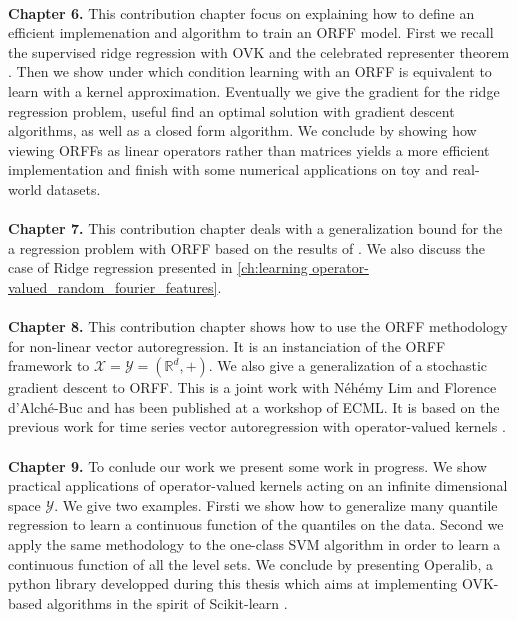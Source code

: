 \paragraph{}
\textbf{Chapter 6.}
This contribution chapter focus on explaining how to define an efficient
implemenation and algorithm to train an \acs{ORFF} model. First we recall
the supervised ridge regression with \acs{OVK} and the celebrated representer
theorem \citep{Wahba90}. Then we show under which condition learning with an
\acs{ORFF} is equivalent to learn with a kernel approximation. Eventually
we give the gradient for the ridge regression problem, useful find an optimal
solution with gradient descent algorithms, as well as a closed form algorithm.
We conclude by showing how viewing \acsp{ORFF} as linear operators rather than 
matrices yields a more efficient implementation and finish with some numerical
applications on toy and real-world datasets.

\paragraph{}
\textbf{Chapter 7.}
This contribution chapter deals with a generalization bound for the a
regression problem with ORFF based on the results of \citet{rahimi2009weighted,
maurer2016vector}.  We also discuss the case of Ridge regression presented in
\cref{ch:learning operator-valued_random_fourier_features}.

\paragraph{}
\textbf{Chapter 8.}
This contribution chapter shows how to use the \acs{ORFF} methodology for
non-linear vector autoregression. It is an instanciation of the \acs{ORFF}
framework to $\mathcal{X}=\mathcal{Y}=(\mathbb{R}^d, +)$. We also give a
generalization of a stochastic gradient descent \citep{dai2014scalable} to
\acs{ORFF}. This is a joint work with N\'eh\'emy Lim and Florence d'Alch\'e-Buc
and has been published at a workshop of \acs{ECML}. It is based on the previous
work \citet{Lim2015} for time series vector autoregression with operator-valued
kernels \cite{brault2016scaling}.

\paragraph{}
\textbf{Chapter 9.}
To conlude our work we present some work in progress. We show practical
applications of operator-valued kernels acting on an infinite dimensional space
$\mathcal{Y}$. We give two examples. Firsti we show how to generalize many
quantile regression to learn a continuous function of the quantiles on the
data. Second we apply the same methodology to the one-class SVM algorithm in
order to learn a continuous function of all the level sets. We conclude by
presenting Operalib, a python library developped during this thesis which aims
at implementing \acs{OVK}-based algorithms in the spirit of Scikit-learn
\citep{pedregosa2011scikit}.


